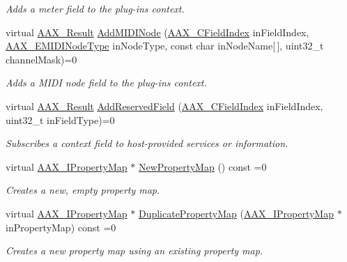 \begin{DoxyCompactItemize}
\begin{DoxyCompactList}\small\item\em Adds a meter field to the plug-\/in\textquotesingle{}s context. \end{DoxyCompactList}\item 
virtual \mbox{\hyperlink{a00392_a4d8f69a697df7f70c3a8e9b8ee130d2f}{A\+A\+X\+\_\+\+Result}} \mbox{\hyperlink{a01781_a6284dda9ccca898e33075de29dad4e39}{Add\+M\+I\+D\+I\+Node}} (\mbox{\hyperlink{a00392_ae807f8986143820cfb5d6da32165c9c7}{A\+A\+X\+\_\+\+C\+Field\+Index}} in\+Field\+Index, \mbox{\hyperlink{a00491_a5e1dffce35d05990dbbad651702678e4}{A\+A\+X\+\_\+\+E\+M\+I\+D\+I\+Node\+Type}} in\+Node\+Type, const char in\+Node\+Name\mbox{[}$\,$\mbox{]}, uint32\+\_\+t channel\+Mask)=0
\begin{DoxyCompactList}\small\item\em Adds a M\+I\+DI node field to the plug-\/in\textquotesingle{}s context. \end{DoxyCompactList}\item 
virtual \mbox{\hyperlink{a00392_a4d8f69a697df7f70c3a8e9b8ee130d2f}{A\+A\+X\+\_\+\+Result}} \mbox{\hyperlink{a01781_a4d0701bda5948e19f0629ffe309ac678}{Add\+Reserved\+Field}} (\mbox{\hyperlink{a00392_ae807f8986143820cfb5d6da32165c9c7}{A\+A\+X\+\_\+\+C\+Field\+Index}} in\+Field\+Index, uint32\+\_\+t in\+Field\+Type)=0
\begin{DoxyCompactList}\small\item\em Subscribes a context field to host-\/provided services or information. \end{DoxyCompactList}\item 
virtual \mbox{\hyperlink{a01869}{A\+A\+X\+\_\+\+I\+Property\+Map}} $\ast$ \mbox{\hyperlink{a01781_a0d7dd21daa8bc588d6a1145c3eb7ef98}{New\+Property\+Map}} () const =0
\begin{DoxyCompactList}\small\item\em Creates a new, empty property map. \end{DoxyCompactList}\item 
virtual \mbox{\hyperlink{a01869}{A\+A\+X\+\_\+\+I\+Property\+Map}} $\ast$ \mbox{\hyperlink{a01781_a107f2d11ba9165ef84162a76368f6ee6}{Duplicate\+Property\+Map}} (\mbox{\hyperlink{a01869}{A\+A\+X\+\_\+\+I\+Property\+Map}} $\ast$in\+Property\+Map) const =0
\begin{DoxyCompactList}\small\item\em Creates a new property map using an existing property map. \end{DoxyCompactList}\item 

\end{DoxyCompactItemize}
